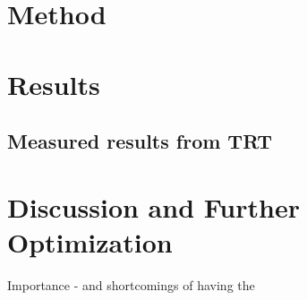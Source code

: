\documentclass[3p]{elsarticle/elsarticle}
\begin{document}
\section{Method}
	
	
\section{Results}
	\subsection{Measured results from TRT}
	

\section{Discussion and Further Optimization}
	

Importance - and shortcomings of having the 

\renewcommand\refname{References}

\end{document}
